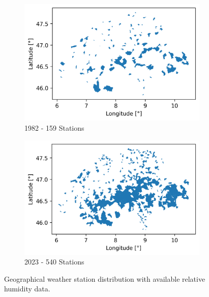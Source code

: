 \begin{figure}[htbp]
    \centering
    \begin{subfigure}[b]{0.45\textwidth}
        \centering
        \includegraphics[width=\textwidth]{thesis/figures/weather_stations_1982.png}
        \caption{1982 - 159 Stations}
        \label{fig:weather_stations_1982}
    \end{subfigure}
    \hfill
    \begin{subfigure}[b]{0.45\textwidth}
        \centering
        \includegraphics[width=\textwidth]{thesis/figures/weather_stations_2023.png}
        \caption{2023 - 540 Stations}
        \label{fig:weather_stations_2023}
    \end{subfigure}
    \caption{Geographical weather station distribution with available relative humidity data.}
    \label{fig:weather_stations}
\end{figure}

